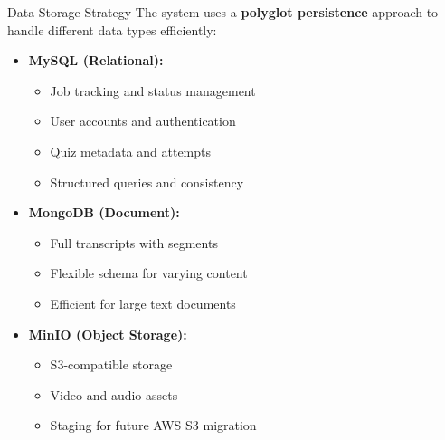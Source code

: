 \documentclass{beamer}
\begin{document}
\begin{frame}{Data Storage Strategy}
    The system uses a \textbf{polyglot persistence} approach to handle different data types efficiently:
    
    \begin{itemize}
        \item \textbf{MySQL (Relational):}
            \begin{itemize}
                \item Job tracking and status management
                \item User accounts and authentication
                \item Quiz metadata and attempts
                \item Structured queries and consistency
            \end{itemize}
        
        \item \textbf{MongoDB (Document):}
            \begin{itemize}
                \item Full transcripts with segments
                \item Flexible schema for varying content
                \item Efficient for large text documents
            \end{itemize}
        
        \item \textbf{MinIO (Object Storage):}
            \begin{itemize}
                \item S3-compatible storage
                \item Video and audio assets
                \item Staging for future AWS S3 migration
            \end{itemize}
    \end{itemize}
\end{frame}
\end{document}

